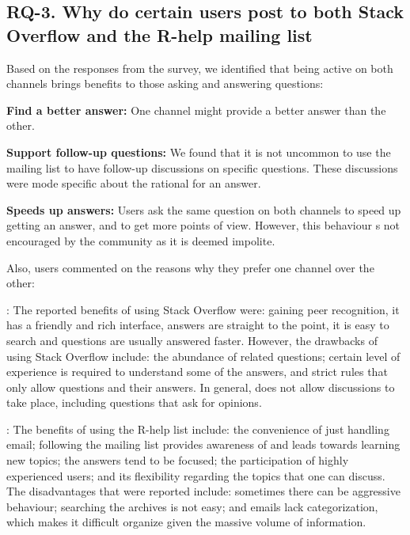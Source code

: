 \subsection{RQ-3. Why do certain users post to both Stack Overflow and the R-help mailing list}

Based on the responses from the survey, we identified that being active on both channels brings benefits to those asking and answering questions:

\begin{packed_enum}
\item \textbf{Find a better answer:} One channel might provide a better answer than the other.
\item \textbf{Support follow-up questions:} We found that it is not uncommon to use the mailing list to have follow-up discussions on specific \SO
  questions. These discussions were mode specific about the rational for an answer.
\item \textbf{Speeds up answers:} Users ask the same question on both channels to speed up getting an answer, and to get more points of view. However, this behaviour s not encouraged by the community as it is deemed impolite.
\end{packed_enum}

 Also, users commented on the reasons why they prefer one channel over the other:

\noindent\textbf{\SO}:
    The reported benefits of using Stack Overflow were: gaining peer recognition, it has a friendly and rich interface, answers are straight to the point, it is
    easy to search and questions are usually answered faster.
    However, the drawbacks of using Stack Overflow include: the abundance
    of related questions; certain level of experience is required to understand some of the answers, and \SO strict rules that only allow questions and their answers. In
    general, \SO does not allow discussions to take place, including questions that ask for opinions.

\noindent\textbf{\RH}:
The benefits of using the R-help list include: the convenience of just handling email; following the mailing list provides awareness of and leads towards
learning new topics; the answers tend to be focused; the participation of highly experienced
users; and its flexibility regarding the topics that one can discuss.  The disadvantages that were reported include: sometimes there can be aggressive
behaviour; searching the archives is not easy; and emails lack categorization, which makes it difficult organize given the massive volume of information.

